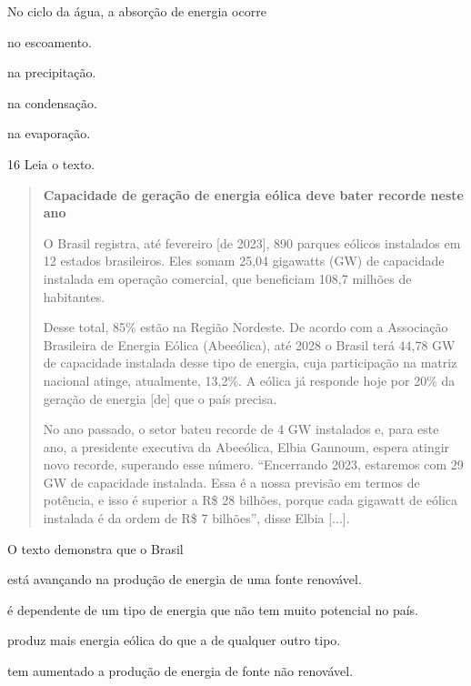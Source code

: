 No ciclo da água, a absorção de energia ocorre

\begin{escolha}
\item
  no escoamento.
\item
  na precipitação.
\item
  na condensação.
\item
  na evaporação.
\end{escolha}

\num{16} Leia o texto.

\begin{quote}
\textbf{Capacidade de geração de energia eólica deve bater recorde neste ano}

O Brasil registra, até fevereiro [de 2023], 890 parques eólicos instalados em 12 estados brasileiros. Eles somam 25,04 gigawatts (GW) de capacidade instalada em operação comercial, que beneficiam 108,7 milhões de habitantes.

Desse total, 85\% estão na Região Nordeste. De acordo com a Associação Brasileira de Energia Eólica (Abeeólica), até 2028 o Brasil terá 44,78 GW de capacidade instalada desse tipo de energia, cuja participação na matriz nacional atinge, atualmente, 13,2\%. A eólica já responde hoje por 20\% da geração de energia [de] que o país precisa.

No ano passado, o setor bateu recorde de 4 GW instalados e, para este ano, a presidente executiva da Abeeólica, Elbia Gannoum, espera atingir novo recorde, superando esse número. “Encerrando 2023, estaremos com 29 GW de capacidade instalada. Essa é a nossa previsão em termos de potência, e isso é superior a R\$ 28 bilhões, porque cada gigawatt de eólica instalada é da ordem de R\$ 7 bilhões”, disse Elbia {[}...{]}.

\end{quote}

O texto demonstra que o Brasil

\begin{escolha}
\item
  está avançando na produção de energia de uma fonte renovável.
\item
  é dependente de um tipo de energia que não tem muito potencial no país.
\item
  produz mais energia eólica do que a de qualquer outro tipo.
\item
  tem aumentado a produção de energia de fonte não renovável.
\end{escolha}

